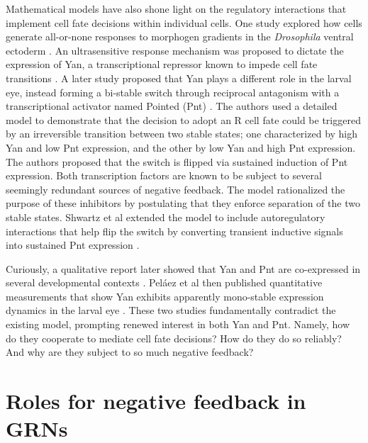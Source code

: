 Mathematical models have also shone light on the regulatory interactions that implement cell fate decisions within individual cells. One study explored how cells generate all-or-none responses to morphogen gradients in the \textit{Drosophila} ventral ectoderm \cite{Melen2005}. An ultrasensitive response mechanism was proposed to dictate the expression of Yan, a transcriptional repressor known to impede cell fate transitions \cite{Lai1992,Rogge1995,Rebay1995}. A later study proposed that Yan plays a different role in the larval eye, instead forming a bi-stable switch through reciprocal antagonism with a transcriptional activator named Pointed (Pnt) \cite{Graham2010}. The authors used a detailed model to demonstrate that the decision to adopt an R cell fate could be triggered by an irreversible transition between two stable states; one characterized by high Yan and low Pnt expression, and the other by low Yan and high Pnt expression. The authors proposed that the switch is flipped via sustained induction of Pnt expression. Both transcription factors are known to be subject to several seemingly redundant sources of negative feedback. The model rationalized the purpose of these inhibitors by postulating that they enforce separation of the two stable states. Shwartz et al extended the model to include autoregulatory interactions that help flip the switch by converting transient inductive signals into sustained Pnt expression \cite{Shwartz2013}. 

Curiously, a qualitative report later showed that Yan and Pnt are co-expressed in several developmental contexts \cite{BoisclairLachance2014}. Pel\'{a}ez et al then published quantitative measurements that show Yan exhibits apparently mono-stable expression dynamics in the larval eye \cite{Pelaez2015a}. These two studies fundamentally contradict the existing model, prompting renewed interest in both Yan and Pnt. Namely, how do they cooperate to mediate cell fate decisions? How do they do so reliably? And why are they subject to so much negative feedback?

\section{Roles for negative feedback in GRNs}
 
